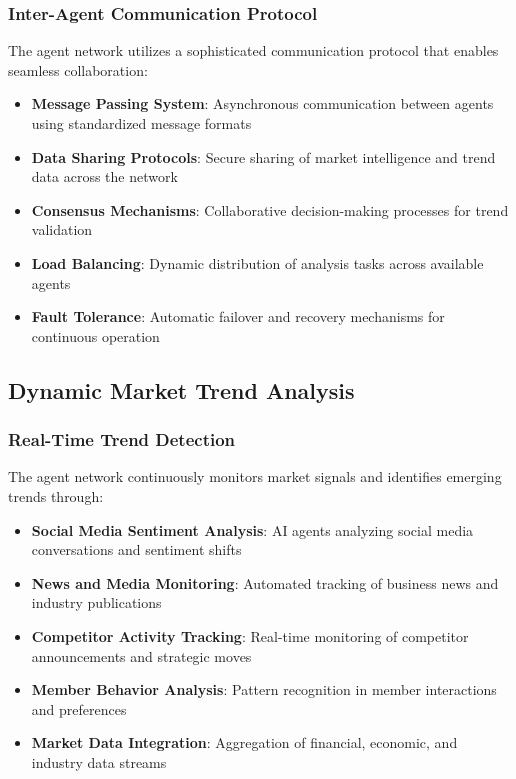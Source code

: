 \subsubsection{Inter-Agent Communication Protocol}

The agent network utilizes a sophisticated communication protocol that enables seamless collaboration:

\begin{itemize}
    \item \textbf{Message Passing System}: Asynchronous communication between agents using standardized message formats
    \item \textbf{Data Sharing Protocols}: Secure sharing of market intelligence and trend data across the network
    \item \textbf{Consensus Mechanisms}: Collaborative decision-making processes for trend validation
    \item \textbf{Load Balancing}: Dynamic distribution of analysis tasks across available agents
    \item \textbf{Fault Tolerance}: Automatic failover and recovery mechanisms for continuous operation
\end{itemize}

\subsection{Dynamic Market Trend Analysis}

\subsubsection{Real-Time Trend Detection}

The agent network continuously monitors market signals and identifies emerging trends through:

\begin{itemize}
    \item \textbf{Social Media Sentiment Analysis}: AI agents analyzing social media conversations and sentiment shifts
    \item \textbf{News and Media Monitoring}: Automated tracking of business news and industry publications
    \item \textbf{Competitor Activity Tracking}: Real-time monitoring of competitor announcements and strategic moves
    \item \textbf{Member Behavior Analysis}: Pattern recognition in member interactions and preferences
    \item \textbf{Market Data Integration}: Aggregation of financial, economic, and industry data streams
\end{itemize}

